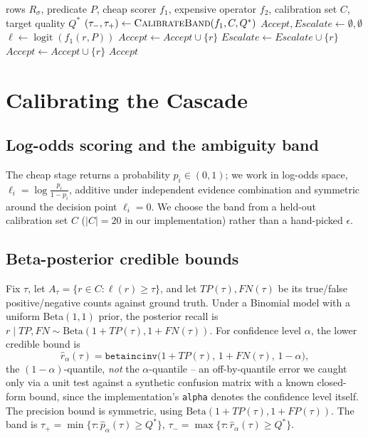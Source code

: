 \documentclass[sigconf,natbib=false]{acmart}
\begin{document}
\begin{algorithm}[t]
\caption{Two-level cascaded semantic filter}
\label{alg:cascade}
\begin{algorithmic}[1]
\Require rows $R_\sigma$, predicate $P$, cheap scorer $f_1$, expensive operator $f_2$, calibration set $C$, target quality $Q^\ast$
\State $(\tau_-, \tau_+) \gets \textsc{CalibrateBand}(f_1, C, Q^\ast)$ \Comment{\S\ref{sec:cascade-math}}
\State $\mathit{Accept}, \mathit{Escalate} \gets \emptyset,\emptyset$
  \State $\ell \gets \operatorname{logit}(f_1(r, P))$
  \If{$\ell \ge \tau_+$} \State $\mathit{Accept} \gets \mathit{Accept} \cup \{r\}$
  \ElsIf{$\ell > \tau_-$} \State $\mathit{Escalate} \gets \mathit{Escalate} \cup \{r\}$
  \EndIf
\EndFor
{} 
   \State $\mathit{Accept} \gets \mathit{Accept} \cup \{r\}$ \EndIf
\EndFor
\State \Return $\mathit{Accept}$
\end{algorithmic}
\end{algorithm}

\section{Calibrating the Cascade}
\label{sec:cascade-math}

\subsection{Log-odds scoring and the ambiguity band}
The cheap stage returns a probability $p_i \in (0,1)$; we work in log-odds space, $\ell_i = \log \frac{p_i}{1-p_i}$, additive under independent evidence combination and symmetric around the decision point $\ell_i=0$. We choose the band from a held-out calibration set $C$ ($|C|{=}20$ in our implementation) rather than a hand-picked $\epsilon$.

\subsection{Beta-posterior credible bounds}
\label{sec:beta-posterior}
Fix $\tau$, let $A_\tau = \{r \in C: \ell(r)\ge\tau\}$, and let $\mathit{TP}(\tau),\mathit{FN}(\tau)$ be its true/false positive/negative counts against ground truth. Under a Binomial model with a uniform Beta$(1,1)$ prior, the posterior recall is $r\mid \mathit{TP},\mathit{FN} \sim \mathrm{Beta}(1{+}\mathit{TP}(\tau), 1{+}\mathit{FN}(\tau))$. For confidence level $\alpha$, the lower credible bound is
\[
  \widehat{r}_{\alpha}(\tau) = \texttt{betaincinv}\bigl(1{+}\mathit{TP}(\tau),\, 1{+}\mathit{FN}(\tau),\, 1-\alpha\bigr),
\]
the $(1{-}\alpha)$-quantile, \emph{not} the $\alpha$-quantile -- an off-by-quantile error we caught only via a unit test against a synthetic confusion matrix with a known closed-form bound, since the implementation's \texttt{alpha} denotes the confidence level itself. The precision bound is symmetric, using $\mathrm{Beta}(1{+}\mathit{TP}(\tau),1{+}\mathit{FP}(\tau))$. The band is $\tau_+=\min\{\tau:\widehat p_\alpha(\tau)\ge Q^\ast\}$, $\tau_-=\max\{\tau:\widehat r_\alpha(\tau)\ge Q^\ast\}$.
\end{document}
